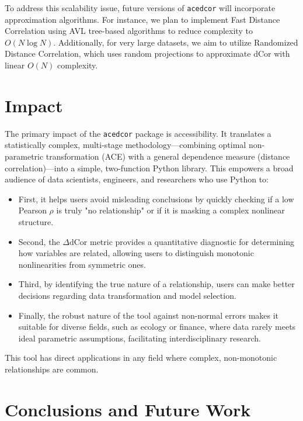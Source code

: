 \documentclass[a4paper,fleqn]{cas-sc}
\newcommand{\dCor}{\mathrm{dCor}}
\begin{document}
To address this scalability issue, future versions of \texttt{acedcor} will incorporate approximation algorithms. For instance, we plan to implement Fast Distance Correlation using AVL tree-based algorithms to reduce complexity to $O(N \log N)$. Additionally, for very large datasets, we aim to utilize Randomized Distance Correlation, which uses random projections to approximate dCor with linear $O(N)$ complexity.

\section{Impact}
\label{sec:impact}


The primary impact of the \texttt{acedcor} package is accessibility. It translates a statistically complex, multi-stage methodology---combining optimal non-parametric transformation (ACE) with a general dependence measure (distance correlation)---into a simple, two-function Python library. This empowers a broad audience of data scientists, engineers, and researchers who use Python to:
\begin{itemize}


  \item First, it helps users avoid misleading conclusions by quickly checking if a low Pearson $\rho$ is truly "no relationship" or if it is masking a complex nonlinear structure.
  \item Second, the $\Delta\dCor$ metric provides a quantitative diagnostic for determining how variables are related, allowing users to distinguish monotonic nonlinearities from symmetric ones.
  \item Third, by identifying the true nature of a relationship, users can make better decisions regarding data transformation and model selection.
  \item Finally, the robust nature of the tool against non-normal errors makes it suitable for diverse fields, such as ecology or finance, where data rarely meets ideal parametric assumptions, facilitating interdisciplinary research.
\end{itemize}
This tool has direct applications in any field where complex, non-monotonic relationships are common.

\raggedright
\justify

% 
\section{Conclusions and Future Work}
\label{sec:conclusions}
\end{document}
